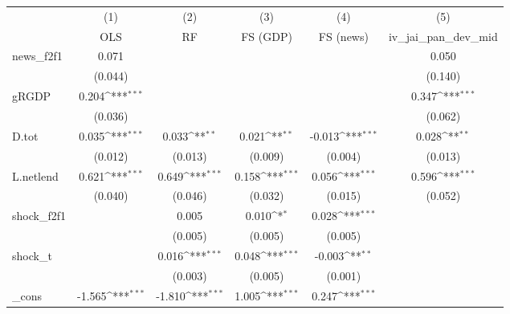 {
\def\sym#1{\ifmmode^{#1}\else\(^{#1}\)\fi}
\begin{tabular}{l*{5}{c}}
\toprule
            &\multicolumn{1}{c}{(1)}&\multicolumn{1}{c}{(2)}&\multicolumn{1}{c}{(3)}&\multicolumn{1}{c}{(4)}&\multicolumn{1}{c}{(5)}\\
            &\multicolumn{1}{c}{OLS}&\multicolumn{1}{c}{RF}&\multicolumn{1}{c}{FS (GDP)}&\multicolumn{1}{c}{FS (news)}&\multicolumn{1}{c}{iv\_jai\_pan\_dev\_mid}\\
\midrule
news\_f2f1   &       0.071         &                     &                     &                     &       0.050         \\
            &     (0.044)         &                     &                     &                     &     (0.140)         \\
\addlinespace
gRGDP       &       0.204\sym{***}&                     &                     &                     &       0.347\sym{***}\\
            &     (0.036)         &                     &                     &                     &     (0.062)         \\
\addlinespace
D.tot       &       0.035\sym{***}&       0.033\sym{**} &       0.021\sym{**} &      -0.013\sym{***}&       0.028\sym{**} \\
            &     (0.012)         &     (0.013)         &     (0.009)         &     (0.004)         &     (0.013)         \\
\addlinespace
L.netlend   &       0.621\sym{***}&       0.649\sym{***}&       0.158\sym{***}&       0.056\sym{***}&       0.596\sym{***}\\
            &     (0.040)         &     (0.046)         &     (0.032)         &     (0.015)         &     (0.052)         \\
\addlinespace
shock\_f2f1  &                     &       0.005         &       0.010\sym{*}  &       0.028\sym{***}&                     \\
            &                     &     (0.005)         &     (0.005)         &     (0.005)         &                     \\
\addlinespace
shock\_t     &                     &       0.016\sym{***}&       0.048\sym{***}&      -0.003\sym{**} &                     \\
            &                     &     (0.003)         &     (0.005)         &     (0.001)         &                     \\
\addlinespace
\_cons      &      -1.565\sym{***}&      -1.810\sym{***}&       1.005\sym{***}&       0.247\sym{***}&                     \\

\end{tabular}}
